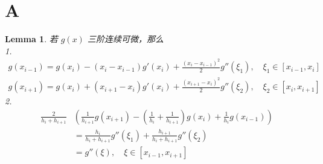\documentclass{ctexart}
\newtheorem{lemma}[theorem]{Lemma}
\theoremstyle{definition}
\theoremstyle{remark}
\numberwithin{equation}{section}
\begin{document}
\appendix

\section*{A}

\begin{lemma} \label{lmm:D2simd2}
    若 \(g(x)\) 三阶连续可微，那么\\
    1.
    \begin{gather*}
        g(x_{i-1}) = g(x_{i}) - (x_{i}-x_{i-1}) g'(x_{i}) + \frac{(x_{i}-x_{i-1})^2}{2} g''(\xi_1), \quad \xi_1 \in [x_{i-1}, x_{i}]        \\
        g(x_{i+1}) = g(x_{i}) + (x_{i+1}-x_{i}) g'(x_{i}) + \frac{(x_{i+1}-x_{i})^2}{2} g''(\xi_2), \quad \xi_2 \in [x_{i}, x_{i+1}]
    \end{gather*}
    2.
    \begin{equation}
        \begin{aligned}
            \frac{2}{h_i + h_{i+1}} &\left( \frac{1}{h_{i+1}} g(x_{i+1}) - (\frac{1}{h_{i}}+\frac{1}{h_{i+1}})g(x_{i}) + \frac{1}{h_{i}} g(x_{i-1}) \right) \\
            &= \frac{h_i}{h_i + h_{i+1}} g''(\xi_1) + \frac{h_{i+1}}{h_i + h_{i+1}} g''(\xi_2)  \\
            &= g''(\xi), \quad \xi \in [x_{i-1}, x_{i+1}]
        \end{aligned}
    \end{equation}
\end{lemma}
\end{document}
